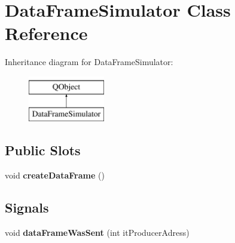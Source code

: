 \hypertarget{class_data_frame_simulator}{}\section{Data\+Frame\+Simulator Class Reference}
\label{class_data_frame_simulator}
Inheritance diagram for Data\+Frame\+Simulator\+:\begin{figure}[H]
\begin{center}
\leavevmode
\includegraphics[height=2.000000cm]{class_data_frame_simulator}
\end{center}
\end{figure}
\subsection*{Public Slots}
\begin{DoxyCompactItemize}
\item 
\mbox{\label{class_data_frame_simulator_afe499b4c9ff0662051950b6276aca227}} 
void {\bfseries create\+Data\+Frame} ()
\end{DoxyCompactItemize}
\subsection*{Signals}
\begin{DoxyCompactItemize}
\item 
\mbox{\label{class_data_frame_simulator_a22027c81ea6b21c553320a86df2a988b}} 
void {\bfseries data\+Frame\+Was\+Sent} (int it\+Producer\+Adress)
\end{DoxyCompactItemize}
